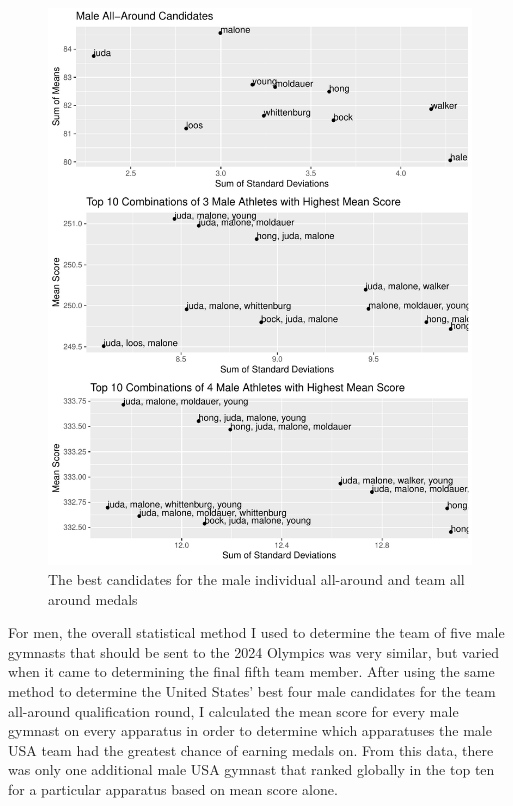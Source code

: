 \documentclass[12pt]{article}
\begin{document}
\begin{figure}
  \centering
  \includegraphics[scale=0.7]{MaleMultipleAllAround.pdf}
  \caption{The best candidates for the male individual all-around and team all around medals}
  \label{fig:FAA}
\end{figure}


For men, the overall statistical method I used to determine the team of five male gymnasts that should be sent 
to the 2024 Olympics was very similar, but varied when it came to determining the final fifth team member. After 
using the same method to determine the United States' best four male candidates for the team all-around qualification 
round, I calculated the mean score for every male gymnast on every apparatus in order to determine which apparatuses 
the male USA team had the greatest chance of earning medals on. From this data, there was only one additional male 
USA gymnast that ranked globally in the top ten for a particular apparatus based on mean score alone.
\end{document}
